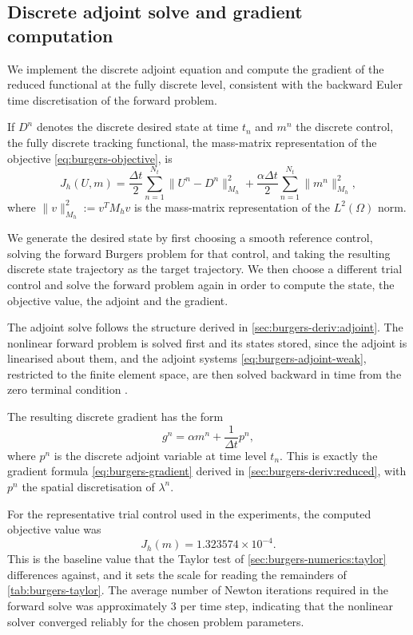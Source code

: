 \documentclass[a4paper,11pt]{article}
\newcommand{\Om}{\Omega}
\newcommand{\Lp}[1]{L^{2}(#1)}              %
\theoremstyle{spacedplain} \newtheorem{theorem}[counter]{Theorem} \newtheorem{lemma}[counter]{Lemma} \newtheorem{prop}[counter]{Proposition} \newtheorem{cor}[counter]{Corollary}
\theoremstyle{spaceddefinition} \newtheorem{defn}[counter]{Definition} \newtheorem{example}[counter]{Example} \newtheorem{remark}[counter]{Remark}
\begin{document}
\subsection{Discrete adjoint solve and gradient computation}
\label{sec:burgers-numerics:adjoint}

We implement the discrete adjoint equation and compute the gradient of the reduced functional at the fully discrete level, consistent with the backward Euler time discretisation of the forward problem.

If $D^n$ denotes the discrete desired state at time $t_n$ and $m^n$ the discrete control, the fully discrete tracking functional, the mass-matrix representation of the objective \cref{eq:burgers-objective}, is
\begin{equation}
  J_h(U, m)
  = \frac{\Delta t}{2} \sum_{n=1}^{N_t} \|U^n - D^n\|_{M_h}^{2}
  + \frac{\alpha \Delta t}{2} \sum_{n=1}^{N_t} \|m^n\|_{M_h}^{2},
\end{equation}
where $\|v\|_{M_h}^{2} := v^{T} M_h v$ is the mass-matrix representation of the $\Lp{\Om}$ norm.

We generate the desired state by first choosing a smooth reference control, solving the forward Burgers problem for that control, and taking the resulting discrete state trajectory as the target trajectory. We then choose a different trial control and solve the forward problem again in order to compute the state, the objective value, the adjoint and the gradient.

The adjoint solve follows the structure derived in \cref{sec:burgers-deriv:adjoint}. The nonlinear forward problem is solved first and its states stored, since the adjoint is linearised about them, and the adjoint systems \cref{eq:burgers-adjoint-weak}, restricted to the finite element space, are then solved backward in time from the zero terminal condition \citep[Sect.~1.4.5]{shfp2017}.

The resulting discrete gradient has the form
\begin{equation}
  g^n = \alpha m^n + \frac{1}{\Delta t} p^n,
\end{equation}
where $p^n$ is the discrete adjoint variable at time level $t_n$. This is exactly the gradient formula \cref{eq:burgers-gradient} derived in \cref{sec:burgers-deriv:reduced}, with $p^n$ the spatial discretisation of $\lambda^n$.

For the representative trial control used in the experiments, the computed objective value was
\begin{equation}
  J_h(m) = 1.323574 \times 10^{-4}.
\end{equation}
This is the baseline value that the Taylor test of \cref{sec:burgers-numerics:taylor} differences against, and it sets the scale for reading the remainders of \cref{tab:burgers-taylor}. The average number of Newton iterations required in the forward solve was approximately $3$ per time step, indicating that the nonlinear solver converged reliably for the chosen problem parameters.
\end{document}
